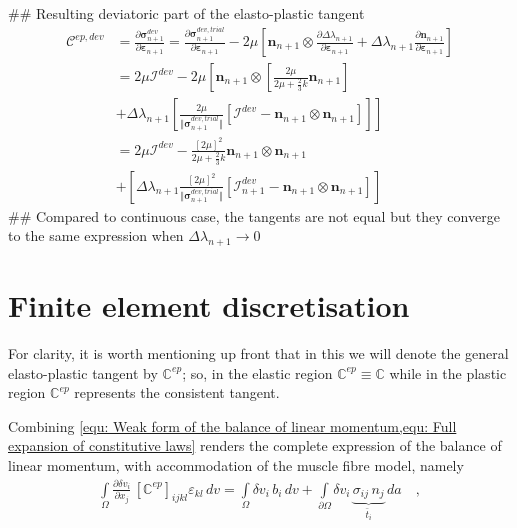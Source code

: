 \documentclass[]{scrartcl}
\begin{document}
\begin{easylist}
\begin{align*}
\end{align*}
## Resulting deviatoric part of the elasto-plastic tangent
\begin{align*}
\boldsymbol{\mathcal{C}}^{ep, dev}
 &= \frac{\partial \boldsymbol{\sigma}^{dev}_{n+1}}{\partial \boldsymbol{\varepsilon}_{n+1}}
  = \frac{\partial \boldsymbol{\sigma}^{dev, trial}_{n+1}}{\partial \boldsymbol{\varepsilon}_{n+1}}
  - 2 \mu \left[ \boldsymbol{n}_{n+1} \otimes \frac{\partial \Delta \lambda_{n+1}}{\partial \boldsymbol{\varepsilon}_{n+1}}
    + \Delta \lambda_{n+1} \frac{\partial \boldsymbol{n}_{n+1}}{\partial \boldsymbol{\varepsilon}_{n+1}} \right]
\\
 &= 2 \mu \boldsymbol{\mathcal{I}}^{dev}
  - 2 \mu \left[ \boldsymbol{n}_{n+1} \otimes \left[ \frac{2 \mu}{{2 \mu + \frac{2}{3} k}} \boldsymbol{n}_{n+1} \right] 
  \right.\\ &\left.
    + \Delta \lambda_{n+1} \left[ \frac{2\mu}{\Vert \boldsymbol{\sigma}^{dev, trial}_{n+1} \Vert} \left[ \boldsymbol{\mathcal{I}}^{dev} - \boldsymbol{n}_{n+1} \otimes \boldsymbol{n}_{n+1} \right] \right] \right]
\\
 &= 2 \mu \boldsymbol{\mathcal{I}}^{dev}
  - \frac{ \left[2 \mu \right]^{2}}{2 \mu + \frac{2}{3} k} \boldsymbol{n}_{n+1} \otimes  \boldsymbol{n}_{n+1} \\ 
 & + \left[\Delta \lambda_{n+1} \frac{\left[ 2 \mu \right]^{2}}{{\Vert \boldsymbol{\sigma}^{dev, trial}_{n+1} \Vert}} \left[ \boldsymbol{\mathcal{I}}^{dev}_{n+1} - \boldsymbol{n}_{n+1} \otimes \boldsymbol{n}_{n+1} \right] \right]
\end{align*}
## Compared to continuous case, the tangents are not equal but they converge to the same expression when $\Delta \lambda_{n+1} \rightarrow 0$
\end{easylist}

\clearpage
\section{Finite element discretisation
\label{sec: FE discretisation}
}
For clarity, it is worth mentioning up front that in this  we will denote the general elasto-plastic tangent by $\boldsymbol{\mathbb{C}}^{ep}$;
so, in the elastic region $\boldsymbol{\mathbb{C}}^{ep} \equiv \boldsymbol{\mathbb{C}}$ while in the plastic region $\boldsymbol{\mathbb{C}}^{ep}$ represents the consistent tangent.

Combining \cref{equ: Weak form of the balance of linear momentum,equ: Full expansion of constitutive laws} renders the complete expression of the balance of linear momentum, with accommodation of the muscle fibre model, namely
\begin{gather}
\int\limits_{\Omega} \frac{\partial \delta v_{i}}{\partial x_{j}} \, \left[ \boldsymbol{\mathbb{C}}^{ep} \right]_{ijkl} \varepsilon_{kl} \, dv
  = \int\limits_{\Omega} \delta v_{i} \, b_{i} \, dv
  + \int\limits_{\partial\Omega} \delta v_{i} \, \underbrace{\sigma_{ij} \, n_{j}}_{\bar{t}_{i}} \, da
\quad ,
\label{equ: Weak form of the balance of linear momentum: Muscle model}
\end{gather}
\end{document}
